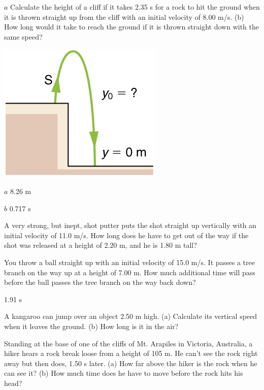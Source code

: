 \documentclass[
]{book}
\newenvironment{problems-exercises}{}{}
\begin{document}
\begin{problems-exercises}
\hypertarget{fs-id4035152}{}
\leavevmode\hypertarget{fs-id1746294}{}%
\(a\) Calculate the height of a cliff if it takes 2.35 s for a rock to
hit the ground when it is thrown straight up from the cliff with an
initial velocity of 8.00 m/s. (b) How long would it take to reach the
ground if it is thrown straight down with the same speed?

\leavevmode\hypertarget{fs-id2367879}{}%
\includegraphics{images/Figure_02_07_05.jpg}

\(a\) 8.26 m

\(b\) 0.717 s

\hypertarget{fs-id2576295}{}
\leavevmode\hypertarget{fs-id1742640}{}%
A very strong, but inept, shot putter puts the shot straight up
vertically with an initial velocity of 11.0 m/s. How long does he have
to get out of the way if the shot was released at a height of 2.20 m,
and he is 1.80 m tall?

\hypertarget{fs-id3543404}{}
\leavevmode\hypertarget{fs-id1471620}{}%
You throw a ball straight up with an initial velocity of 15.0 m/s. It
passes a tree branch on the way up at a height of 7.00 m. How much
additional time will pass before the ball passes the tree branch on the
way back down?

\leavevmode\hypertarget{fs-id2042262}{}%
1.91 s

\hypertarget{fs-id4076783}{}
\leavevmode\hypertarget{fs-id1544876}{}%
A kangaroo can jump over an object 2.50 m high. (a) Calculate its
vertical speed when it leaves the ground. (b) How long is it in the air?

\hypertarget{fs-id4073110}{}
\leavevmode\hypertarget{fs-id2360908}{}%
Standing at the base of one of the cliffs of Mt. Arapiles in Victoria,
Australia, a hiker hears a rock break loose from a height of 105 m. He
can't see the rock right away but then does, 1.50 s later. (a) How far
above the hiker is the rock when he can see it? (b) How much time does
he have to move before the rock hits his head?


\end{problems-exercises}
\end{document}
